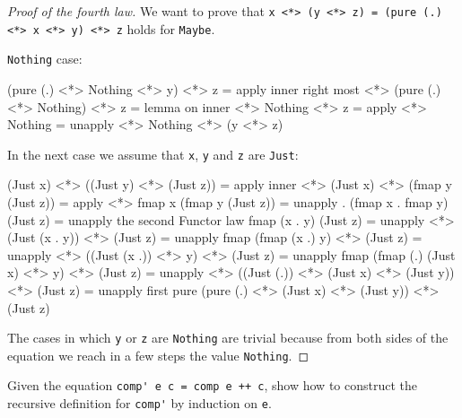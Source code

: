 \documentclass[12pt]{article}
\newenvironment{code}{\endgraf\verbatim}{\endverbatim}
\newenvironment{problem}[2][Problem]{\begin{trivlist}
\item[\hskip \labelsep {\bfseries #1}\hskip \labelsep {\bfseries #2.}]}{\end{trivlist}}
\begin{document}
\begin{proof}[Proof of the fourth law]
We want to prove that \verb|x <*> (y <*> z) = (pure (.) <*> x <*> y) <*> z| holds for \verb|Maybe|.

\verb|Nothing| case:

\begin{code}
  (pure (.) <*> Nothing <*> y) <*> z
=   { apply inner right most <*> }
  (pure (.) <*> Nothing) <*> z
=   { lemma on inner <*> }
  Nothing <*> z
=   { apply <*> }
  Nothing
=   { unapply <*> }
  Nothing <*> (y <*> z)
\end{code}

In the next case we assume that \verb|x|, \verb|y| and \verb|z| are \verb|Just|:

\begin{code}
  (Just x) <*> ((Just y) <*> (Just z))
=   { apply inner <*> }
  (Just x) <*> (fmap y (Just z))
=   { apply <*> }
  fmap x (fmap y (Just z))
=   { unapply . }
  (fmap x . fmap y) (Just z)
=   { unapply the second Functor law }
  fmap (x . y) (Just z)
=   { unapply <*> }
  (Just (x . y)) <*> (Just z)
=   { unapply fmap }
  (fmap (x .) y) <*> (Just z)
=   { unapply <*> }
  ((Just (x .)) <*> y) <*> (Just z)
=   { unapply fmap }
  (fmap (.) (Just x) <*> y) <*> (Just z)
=   { unapply <*> }
  ((Just (.)) <*> (Just x) <*> (Just y)) <*> (Just z)
=   { unapply first pure }
  (pure (.) <*> (Just x) <*> (Just y)) <*> (Just z)
\end{code}

The cases in which \verb|y| or \verb|z| are \verb|Nothing| are trivial because from both sides of the equation we reach in a few steps the value \verb|Nothing|.
\end{proof}


\begin{problem}{5}
Given the equation \verb|comp' e c = comp e ++ c|, show how to construct the recursive definition for \verb|comp'| by induction on \verb|e|.
\end{problem}
\end{document}
